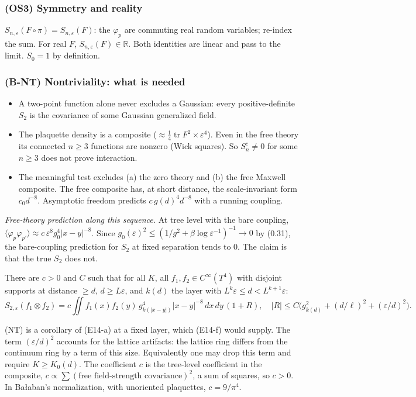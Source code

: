 \subsubsection{(OS3) Symmetry and reality}\label{sec:OS3}
$S_{n,\varepsilon}(F\circ\pi)=S_{n,\varepsilon}(F)$: the $\varphi_p$ are commuting real random variables; re-index the sum. For real $F$, $S_{n,\varepsilon}(F)\in\mathbb R$. Both identities are linear and pass to the limit. $S_0=1$ by definition.

\subsubsection{(B-NT) Nontriviality: what is needed}\label{sec:BNT}
\begin{itemize}
\item A two-point function alone never excludes a Gaussian: every positive-definite $S_2$ is the covariance of some Gaussian generalized field.
\item The plaquette density is a composite ($\approx\tfrac14\operatorname{tr}F^2\times\varepsilon^4$). Even in the free theory its connected $n\ge3$ functions are nonzero (Wick squares). So $S_n^c\ne0$ for some $n\ge3$ does not prove interaction.
\item The meaningful test excludes (a) the zero theory and (b) the free Maxwell composite. The free composite has, at short distance, the scale-invariant form $c_0d^{-8}$. Asymptotic freedom predicts $c\,g(d)^4d^{-8}$ with a running coupling.
\end{itemize}
\emph{Free-theory prediction along this sequence.} At tree level with the bare coupling, $\langle\varphi_p\varphi_{p'}\rangle\approx c\,\varepsilon^8g_0^4|x-y|^{-8}$. Since $g_0(\varepsilon)^2\le(1/g^2+\beta\log\varepsilon^{-1})^{-1}\to0$ by (0.31), the bare-coupling prediction for $S_2$ at fixed separation tends to $0$. The claim is that the true $S_2$ does not.

\begin{hypothesis}
There are $c>0$ and $C$ such that for all $K$, all $f_1,f_2\in C^\infty(T^4)$ with disjoint supports at distance $\ge d$, $d\ge L\varepsilon$, and $k(d)$ the layer with $L^k\varepsilon\le d<L^{k+1}\varepsilon$:
\[S_{2,\varepsilon}(f_1\otimes f_2)=c\iint f_1(x)f_2(y)\,g_{k(|x-y|)}^4|x-y|^{-8}\,dx\,dy\,(1+R),\quad|R|\le C\bigl(g_{k(d)}^2+(d/\ell)^2+(\varepsilon/d)^2\bigr).\]
\end{hypothesis}
(NT) is a corollary of (E14-a) at a fixed layer, which (E14-f) would supply. The term $(\varepsilon/d)^2$ accounts for the lattice artifacts: the lattice ring differs from the continuum ring by a term of this size. Equivalently one may drop this term and require $K\ge K_0(d)$. The coefficient $c$ is the tree-level coefficient in the composite, $c\propto\sum(\text{free field-strength covariance})^2$, a sum of squares, so $c>0$. In Ba{\l}aban's normalization, with unoriented plaquettes, $c=9/\pi^4$.

